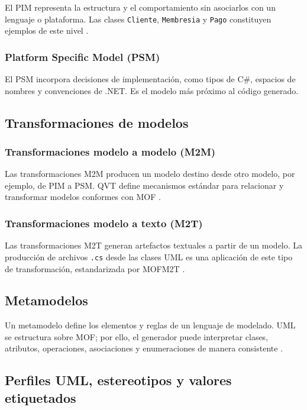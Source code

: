 \documentclass[12pt,a4paper]{article}
\begin{document}
El PIM representa la estructura y el comportamiento sin asociarlos con un
lenguaje o plataforma. Las clases \texttt{Cliente}, \texttt{Membresia} y
\texttt{Pago} constituyen ejemplos de este nivel \cite{omgUML2017}.

\subsubsection{Platform Specific Model (PSM)}

El PSM incorpora decisiones de implementación, como tipos de C\#, espacios de
nombres y convenciones de .NET. Es el modelo más próximo al código generado.

\subsection{Transformaciones de modelos}

\subsubsection{Transformaciones modelo a modelo (M2M)}

Las transformaciones M2M producen un modelo destino desde otro modelo, por
ejemplo, de PIM a PSM. QVT define mecanismos estándar para relacionar y
transformar modelos conformes con MOF \cite{omgQVT2016}.

\subsubsection{Transformaciones modelo a texto (M2T)}

Las transformaciones M2T generan artefactos textuales a partir de un modelo.
La producción de archivos \texttt{.cs} desde las clases UML es una aplicación
de este tipo de transformación, estandarizada por MOFM2T
\cite{omgMOFM2T2008}.

\subsection{Metamodelos}

Un metamodelo define los elementos y reglas de un lenguaje de modelado. UML se
estructura sobre MOF; por ello, el generador puede interpretar clases,
atributos, operaciones, asociaciones y enumeraciones de manera consistente
\cite{omgUML2017}.

\subsection{Perfiles UML, estereotipos y valores etiquetados}
\end{document}
